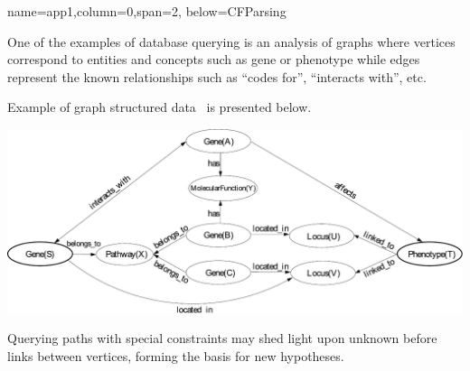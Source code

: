 \documentclass[a0paper,portrait]{baposter}
\begin{document}
\begin{poster}

{name=app1,column=0,span=2, below=CFParsing}
{ %
One of the examples of database querying is an analysis of graphs where vertices correspond to entities and concepts such as gene or phenotype while edges represent the known relationships such as ``codes for'', ``interacts with'', etc.

Example of graph structured data~\cite{Earley} is presented below.

\begin{center}
\includegraphics[width=\textwidth]{gsd.pdf}
\end{center}
Querying paths with special constraints may shed light upon unknown before links between vertices, forming the basis for new hypotheses.
}



\end{poster}
\end{document}

